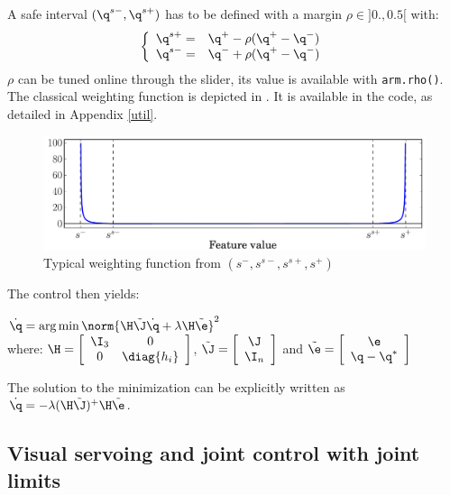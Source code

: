 \documentclass{ecnreport}
\begin{document}
A safe interval $(\q^{s-}, \q^{s+})$ has to be defined with a margin $\rho\in]0.,0.5[$ with:
\begin{equation*}
\left\{\begin{array}{ll}
	\q^{s+} = & \q^{+} - \rho(\q^+ - \q^-) \\
	\q^{s-} = & \q^{-} + \rho(\q^+ - \q^-)
\end{array}\right.
\end{equation*}$\rho$ can be tuned online through the slider, its value is available with \texttt{arm.rho()}.\\

The classical weighting function is depicted in . It is available in the code, as detailed in Appendix \ref{util}.
\begin{figure}[h]\centering
	\includegraphics[width=.7\linewidth]{constraint_0inf}
	\caption{Typical weighting function from $(s^-, s^{s-}, s^{s+}, s^+)$}
	\label{weight}		
\end{figure}

The control then yields: 
\begin{center}
	$\dot \q = \arg\min \norm{\H\tilde\J\dot \q + \lambda\H\tilde\e}^2$ \\
 where: $\H = \left[\begin{array}{cc}\I_3 & 0 \\ 0 & \diag{h_i}\end{array}\right]$,
 $\tilde\J = \left[\begin{array}{c}\J \\ \I_n \end{array}\right]$ and
  $\tilde\e = \left[\begin{array}{c}\e \\ \q - \q^* \end{array}\right]$
\end{center}
The solution to the minimization can be explicitly written as $\dot \q = -\lambda(\H\tilde\J)^+\H\tilde\e$.\\

\subsection{Visual servoing and joint control with joint limits }
\end{document}
